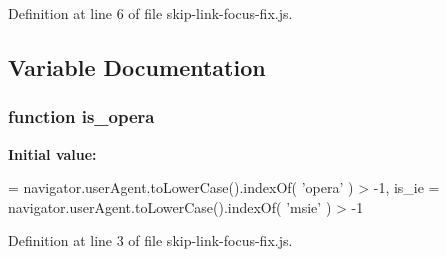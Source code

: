 Definition at line 6 of file skip-\/link-\/focus-\/fix.\+js.



\subsection{Variable Documentation}
\hypertarget{skip-link-focus-fix_8js_affaf3658f81e9773bb25521a76312ab1}{}
\subsubsection[{is\+\_\+opera}]{\setlength{\rightskip}{0pt plus 5cm}function is\+\_\+opera}\label{skip-link-focus-fix_8js_affaf3658f81e9773bb25521a76312ab1}
{\bfseries Initial value\+:}
\begin{DoxyCode}
= navigator.userAgent.toLowerCase().indexOf( \textcolor{stringliteral}{'opera'} )  > -1,
        is\_ie     = navigator.userAgent.toLowerCase().indexOf( \textcolor{stringliteral}{'msie'} )   > -1
\end{DoxyCode}


Definition at line 3 of file skip-\/link-\/focus-\/fix.\+js.

